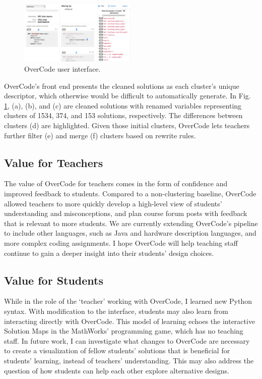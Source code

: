 \documentclass{sigchi}
\begin{document}
\begin{figure}[h!]
\centering
\includegraphics[width=0.5\textwidth]{frontPageInterfacePreviewLabeled.jpg}
\caption{OverCode user interface.}
\label{fig:figure1}
\end{figure}

OverCode's front end presents the cleaned solutions as each cluster's unique descriptor, which otherwise would be difficult to automatically generate. In Fig. \ref{fig:figure1}, (a), (b), and (c) are cleaned solutions with renamed variables representing clusters of 1534, 374, and 153 solutions, respectively. The differences between clusters (d) are highlighted. Given those initial clusters, OverCode lets teachers further filter (e) and merge (f) clusters based on rewrite rules.

\subsection{Value for Teachers}
The value of OverCode for teachers comes in the form of confidence and improved feedback to students. Compared to a non-clustering baseline, OverCode allowed teachers to more quickly develop a high-level view of students' understanding and misconceptions, and plan course forum posts with feedback that is relevant to more students. We are currently extending OverCode's pipeline to include other languages, such as Java and hardware description languages, and more complex coding assignments. I hope OverCode will help teaching staff continue to gain a deeper insight into their students' design choices.

\subsection{Value for Students}
While in the role of the `teacher' working with OverCode, I learned new Python syntax. With modification to the interface, students may also learn from interacting directly with OverCode. This model of learning echoes the interactive Solution Maps in the MathWorks' programming game, which has no teaching staff. In future work, I can investigate what changes to OverCode are necessary to create a visualization of fellow students' solutions that is beneficial for students' learning, instead of teachers' understanding. This may also address the question of how students can help each other explore alternative designs.
\end{document}
